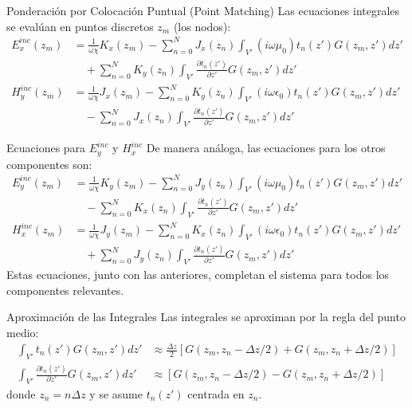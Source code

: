 \documentclass{beamer}
\begin{document}
\begin{frame}{Ponderación por Colocación Puntual (Point Matching)}
    Las ecuaciones integrales se evalúan en puntos discretos $z_m$ (los nodos):
    \begin{align*}
        E_x^{inc}(z_m) &= \frac{1}{\omega\chi} K_x(z_m) - \sum_{n=0}^{N} J_x(z_n) \int_{V'} (i\omega\mu_0) t_n(z') G(z_m, z') dz' \\
        &\quad + \sum_{n=0}^{N} K_y(z_n) \int_{V'} \frac{\partial t_n(z')}{\partial z'} G(z_m, z') dz' \\[1em]
        H_y^{inc}(z_m) &= \frac{1}{\omega\chi} J_x(z_m) - \sum_{n=0}^{N} K_y(z_n) \int_{V'} (i\omega\epsilon_0) t_n(z') G(z_m, z') dz' \\
        &\quad - \sum_{n=0}^{N} J_x(z_n) \int_{V'} \frac{\partial t_n(z')}{\partial z'} G(z_m, z') dz'
    \end{align*}
\end{frame}

\begin{frame}{Ecuaciones para $E_y^{inc}$ y $H_x^{inc}$}
    De manera análoga, las ecuaciones para los otros componentes son:
    \begin{align*}
        E_y^{inc}(z_m) &= \frac{1}{\omega\chi} K_y(z_m) - \sum_{n=0}^{N} J_y(z_n) \int_{V'} (i\omega\mu_0) t_n(z') G(z_m, z') dz' \\
        &\quad - \sum_{n=0}^{N} K_x(z_n) \int_{V'} \frac{\partial t_n(z')}{\partial z'} G(z_m, z') dz' \\[1em]
        H_x^{inc}(z_m) &= \frac{1}{\omega\chi} J_y(z_m) - \sum_{n=0}^{N} K_x(z_n) \int_{V'} (i\omega\epsilon_0) t_n(z') G(z_m, z') dz' \\
        &\quad + \sum_{n=0}^{N} J_y(z_n) \int_{V'} \frac{\partial t_n(z')}{\partial z'} G(z_m, z') dz'
    \end{align*}
    Estas ecuaciones, junto con las anteriores, completan el sistema para todos los componentes relevantes.
\end{frame}

\begin{frame}{Aproximación de las Integrales}
    Las integrales se aproximan por la regla del punto medio:
    \begin{align*}
        \int_{V'} t_n(z') G(z_m, z') dz' &\approx \frac{\Delta z}{2} \left[ G(z_m, z_n - \Delta z/2) + G(z_m, z_n + \Delta z/2) \right] \\
        \int_{V'} \frac{\partial t_n(z')}{\partial z'} G(z_m, z') dz' &\approx \left[ G(z_m, z_n - \Delta z/2) - G(z_m, z_n + \Delta z/2) \right]
    \end{align*}
    donde $z_n = n\Delta z$ y se asume $t_n(z')$ centrada en $z_n$.
\end{frame}
\end{document}
